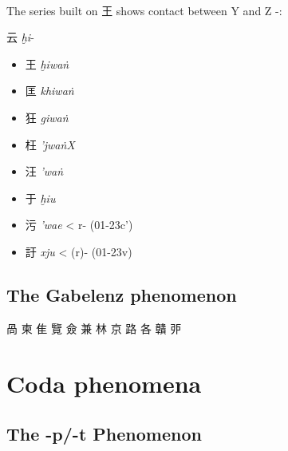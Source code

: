 \paragraph{}
The series built on 王 
shows contact between Y and Z -:


云 \emph{ḫi}- 

\begin{itemize}\item
{\Large{王}}  \emph{ḫiwaṅ} %
\item
{\Large{匡}}  \emph{khiwaṅ} %
\item
{\Large{狂}}  \emph{giwaṅ} %
\item
{\Large{枉}}  \emph{'jwaṅX} %
\item
{\Large{汪}}  \emph{'waṅ} %
\end{itemize}


\begin{itemize}\item
于 \emph{ḫiu} %
\item
污  \emph{'wae} \textless{} {}r- (01-23c')
\item
訏 \emph{xju} \textless{} {}(r)- (01-23v)
\end{itemize}







\subsection{The Gabelenz phenomenon}

咼
柬
隹
覽
僉
兼
林
京
路
各
贛
戼

\section{Coda phenomena}

\subsection{The -p/-t Phenomenon}


